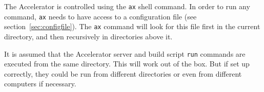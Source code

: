 
\newcommand{\cmd}{\texttt{ax}\xspace}





The Accelerator is controlled using the \cmd shell command.  In order
to run any command, \cmd needs to have access to a configuration file
(see section~\ref{sec:configfile}).  The \cmd command will look for this file first
in the current directory, and then recursively in directories above
it.

It is assumed that the Accelerator server and build script
\texttt{run} commands are executed from the same directory.  This will
work out of the box.  But if set up correctly, they could be run from
different directories or even from different computers if necessary.

